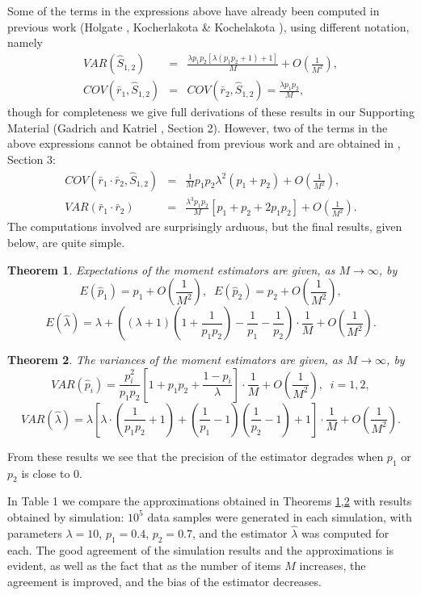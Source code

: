 \documentclass[a4paper,10pt,twoside]{article}
\newtheorem{theorem}{Theorem}
\begin{document}
Some of the terms in the expressions above have already been computed in previous work (Holgate \cite{holgate}, Kocherlakota \& Kochelakota \cite{kocherlakota}), using different notation, namely
\begin{eqnarray}\label{holgate}VAR(\hat{S}_{1,2})&=&\frac{\lambda p_1p_2[\lambda(p_1p_2+1)+1]}{M}+O\left(\frac{1}{M^2}\right),\\
COV(\bar{r}_1,\hat{S}_{1,2})&=&COV(\bar{r}_2,\hat{S}_{1,2})=\frac{\lambda p_1 p_2}{M},\nonumber\end{eqnarray}
though for completeness we give full derivations of these results in our Supporting Material (Gadrich and Katriel \cite{gadrich}, Section 2).
However, two of the terms in the above expressions cannot be obtained from previous work and are obtained in \cite{gadrich}, Section 
3:
\begin{eqnarray*}COV(\bar{r}_1\cdot\bar{r}_2,\hat{S}_{1,2})&=&\frac{1}{M}p_1 p_2\lambda^2 \left(p_1+p_2\right)+O\left(\frac{1}{M^2}\right),\\
VAR(\bar{r}_1\cdot\bar{r}_2)&=&\frac{\lambda^3 p_1p_2}{M}[p_1+p_2+2p_1p_2]+O\left(\frac{1}{M^2}\right).\nonumber
\end{eqnarray*}
The computations involved are surprisingly arduous, but the final results, given below, are 
quite simple. 
\begin{theorem}\label{exp}
	Expectations of the moment estimators are given, as $M\rightarrow \infty$, by
	$$E(\hat{p}_1) =p_1+ O\left(\frac{1}{M^2}\right),\;\;E(\hat{p}_2) =p_2+ O\left(\frac{1}{M^2}\right),$$
	$$E(\hat{\lambda})=\lambda
	+ \left((\lambda+1)\left(1+\frac{1 }{p_1 p_2}\right)-\frac{1}{p_1}-\frac{1}{p_2}\right)\cdot \frac{1}{M}+O\left(\frac{1}{M^2}\right).$$
\end{theorem}
\begin{theorem}\label{variance}
	The variances of the moment estimators are given, as $M\rightarrow\infty$, by
	$$VAR(\hat{p}_i) =\frac{p_i^2}{p_1p_2}\left[1+p_1p_2 +\frac{1
		- p_i}{\lambda}  \right]\cdot \frac{1}{M} + O\left(\frac{1}{M^2}\right),\;\;i=1,2,$$
	$$VAR(\hat{\lambda})=\lambda \left[\lambda\cdot \left(\frac{1}{p_1p_2}+1\right)+ \left(\frac{1}{p_1}-1 \right)\left(\frac{1}{p_2}-1\right)+1 \right]\cdot \frac{1}{M}+O\left(\frac{1}{M^2}\right).$$
\end{theorem}

From these results we see that the precision of the estimator degrades when $p_1$ or $p_2$ is close to $0$.

In Table 1 we compare the approximations obtained in Theorems \ref{exp},\ref{variance} with results obtained 
by simulation: $10^5$ data samples were generated in each simulation, with parameters $\lambda=10$, $p_1=0.4$, $p_2=0.7$, and 
the estimator $\hat{\lambda}$ was computed for each. The good agreement of the simulation results and the approximations is evident,
as well as the fact that as the number of items $M$ increases, the agreement is improved, and the bias of the estimator decreases.
\end{document}

